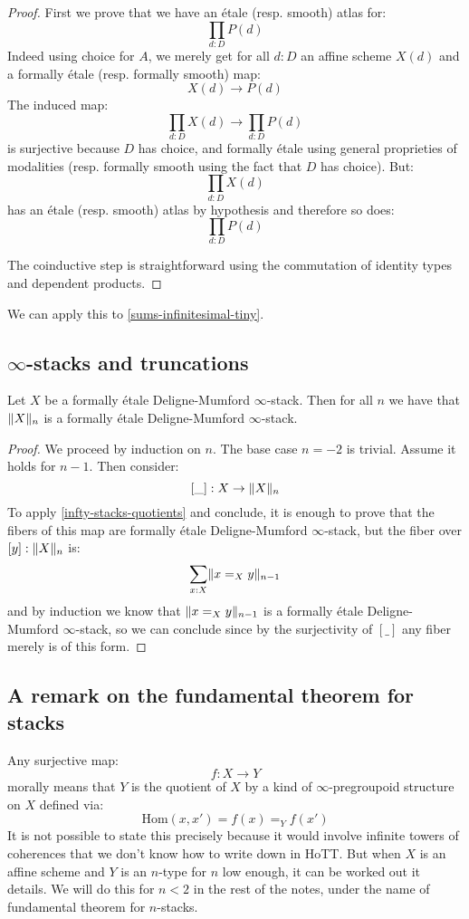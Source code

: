 \begin{proof}
First we prove that we have an étale (resp. smooth) atlas for:
\[\prod_{d:D}P(d)\]
Indeed using choice for $A$, we merely get for all $d:D$ an affine scheme $X(d)$ and a formally étale (resp. formally smooth) map:
\[X(d)\to P(d)\]
The induced map:
\[\prod_{d:D}X(d) \to \prod_{d:D}P(d)\] 
is surjective because $D$ has choice, and formally étale using general proprieties of modalities (resp. formally smooth using the fact that $D$ has choice). But:
\[\prod_{d:D}X(d)\]
has an étale (resp. smooth) atlas by hypothesis and therefore so does:
\[\prod_{d:D}P(d)\]

The coinductive step is straightforward using the commutation of identity types and dependent products.
\end{proof}

We can apply this to \cref{sums-infinitesimal-tiny}.

\subsection{$\infty$-stacks and truncations}

\begin{proposition}
Let $X$ be a formally étale Deligne-Mumford $\infty$-stack. Then for all $n$ we have that $\lVert X \rVert_n$ is a formally étale Deligne-Mumford $\infty$-stack.
\end{proposition}

\begin{proof}
We proceed by induction on $n$. The base case $n=-2$ is trivial. Assume it holds for $n-1$. Then consider:
\[[\_] : X\to \lVert X \rVert_n\]
To apply \cref{infty-stacks-quotients} and conclude, it is enough to prove that the fibers of this map are formally étale Deligne-Mumford $\infty$-stack, but the fiber over $[y]:\lVert X \rVert_n$ is:
\[\sum_{x:X} \lVert x=_Xy \rVert_{n-1}\]
and by induction we know that $\lVert x=_Xy \rVert_{n-1}$ is a formally étale Deligne-Mumford $\infty$-stack, so we can conclude since by the surjectivity of $[\_]$ any fiber merely is of this form.
\end{proof}

\subsection{A remark on the fundamental theorem for stacks}

Any surjective map:
\[f:X\to Y\]
morally means that $Y$ is the quotient of $X$ by a kind of $\infty$-pregroupoid structure on $X$ defined via:
\[\mathrm{Hom}(x,x') = f(x)=_Yf(x')\]
It is not possible to state this precisely because it would involve infinite towers of coherences that we don't know how to write down in HoTT. But when $X$ is an affine scheme and $Y$ is an $n$-type for $n$ low enough, it can be worked out it details. We will do this for $n<2$ in the rest of the notes, under the name of fundamental theorem for $n$-stacks.

